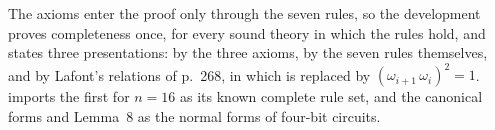 \begin{code}%
\>[0]\AgdaSpace{}%
\AgdaSymbol{:}\AgdaSpace{}%
\AgdaSpace{}%
\AgdaSymbol{\{}\AgdaSymbol{\}}\AgdaSpace{}%
\AgdaSymbol{\{}\AgdaSpace{}%
\AgdaSpace{}%
\AgdaSymbol{:}\AgdaSpace{}%
\AgdaSpace{}%
\AgdaSymbol{\}}\AgdaSpace{}%
\AgdaSpace{}%
\AgdaSpace{}%
\AgdaSpace{}%
\AgdaSpace{}%
\AgdaSpace{}%
\AgdaSpace{}%
\AgdaSpace{}%
\AgdaSpace{}%
\AgdaSpace{}%
\AgdaSpace{}%
\AgdaSpace{}%
\<%
\\
\>[0]\AgdaSpace{}%
\AgdaSymbol{:}\AgdaSpace{}%
\AgdaSpace{}%
\AgdaSymbol{\{}\AgdaSymbol{\}}\AgdaSpace{}%
\AgdaSymbol{\{}\AgdaSpace{}%
\AgdaSpace{}%
\AgdaSymbol{:}\AgdaSpace{}%
\AgdaSpace{}%
\AgdaSymbol{\}}\AgdaSpace{}%
\AgdaSpace{}%
\AgdaSpace{}%
\AgdaSpace{}%
\AgdaSpace{}%
\AgdaSpace{}%
\AgdaSpace{}%
\AgdaSpace{}%
\AgdaSpace{}%
\AgdaSpace{}%
\AgdaSpace{}%
\AgdaSpace{}%
\<%
\end{code}
\begin{code}[hide]%
\>[0]\AgdaSpace{}%
\AgdaSymbol{=}\AgdaSpace{}%
\<%
\\
\>[0]\AgdaSpace{}%
\AgdaSymbol{=}\AgdaSpace{}%
\<%
\end{code}

The axioms enter the proof only through the seven rules, so the development proves completeness once, for every sound theory in which the rules hold, and states three presentations: by the three axioms, by the seven rules themselves, and by Lafont's relations of p.~268, in which  is replaced by $(\omega_{i+1}\,\omega_i)^2=1$.  imports the first for $n=16$ as its known complete rule set, and the canonical forms and Lemma~8 as the normal forms of four-bit circuits.

\FloatBarrier

